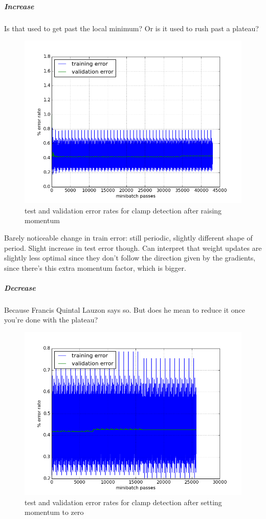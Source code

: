 \documentclass[a4paper,11pt]{article}
\begin{document}
\subparagraph{Increase}

Is that used to get past the local minimum? Or is it used to rush past a plateau?

\begin{figure}[h!]
	\centering
	\includegraphics[scale=0.5]{images/raise_momentum.png}
	\caption{test and validation error rates for clamp detection after raising momentum}
\end{figure}

Barely noticeable change in train error: still periodic, slightly different shape of period. Slight increase in test error though. Can interpret that weight updates are slightly less optimal since they don't follow the direction given by the gradients, since there's this extra momentum factor, which is bigger.

\subparagraph{Decrease}

Because Francis Quintal Lauzon says so. But does he mean to reduce it once you're done with the plateau?

\begin{figure}[h!]
	\centering
	\includegraphics[scale=0.5]{images/change_momentum.png}
	\caption{test and validation error rates for clamp detection after setting momentum to zero}
\end{figure}
\end{document}
